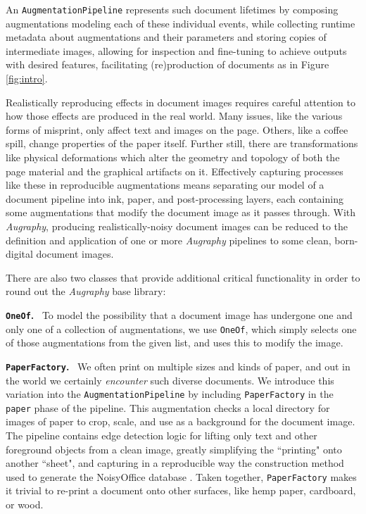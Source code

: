 \documentclass[runningheads]{llncs}
\begin{document}
An \texttt{AugmentationPipeline} represents such document lifetimes by composing augmentations modeling each of these individual events, while collecting runtime metadata about augmentations and their parameters and storing copies of intermediate images, allowing for inspection and fine-tuning to achieve outputs with desired features, facilitating (re)production of documents as in Figure \ref{fig:intro}.

Realistically reproducing effects in document images requires careful attention to how those effects are produced in the real world.
Many issues, like the various forms of misprint, only affect text and images on the page.
Others, like a coffee spill, change properties of the paper itself. Further still, there are transformations like physical deformations which alter the geometry and topology of both the page material and the graphical artifacts on it.
Effectively capturing processes like these in reproducible augmentations means separating our model of a document pipeline into ink, paper, and post-processing layers, each containing some augmentations that modify the document image as it passes through.
With \emph{Augraphy}, producing realistically-noisy document images can be reduced to the definition and application of one or more \emph{Augraphy} pipelines to some clean, born-digital document images.

\sectionfont{\keepall}
There are also two classes that provide additional critical functionality in order to round out the \emph{Augraphy} base library:

\noindent\textbf{\texttt{OneOf}.} ~To model the possibility that a document image has undergone one and only one of a collection of augmentations, we use \texttt{OneOf}, which simply selects one of those augmentations from the given list, and uses this to modify the image.

\sectionfont{\normalfont}
\noindent\textbf{\texttt{PaperFactory}.} ~We often print on multiple sizes and kinds of paper, and out in the world we certainly \textit{encounter} such diverse documents.
We introduce this variation into the \texttt{AugmentationPipeline} by including \texttt{PaperFactory} in the \texttt{paper} phase of the pipeline.
This augmentation checks a local directory for images of paper to crop, scale, and use as a background for the document image.
The pipeline contains edge detection logic for lifting only text and other foreground objects from a clean image, greatly simplifying the ``printing" onto another ``sheet", and capturing in a reproducible way the construction method used to generate the NoisyOffice database \cite{ref_NoisyOfficeDatabase}.
Taken together, \texttt{PaperFactory} makes it trivial to re-print a document onto other surfaces, like hemp paper, cardboard, or wood.
\end{document}
